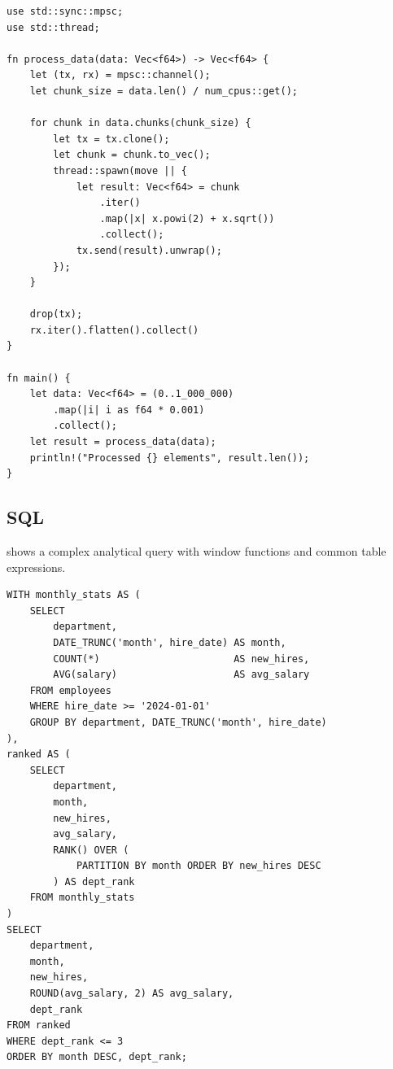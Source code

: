 \documentclass[
    language=english,
    doctype=article,
    institution=none,
    titlestyle=book,
]{../../omnilatex}
\theoremstyle{definition}
\theoremstyle{definition}
\theoremstyle{remark}
\begin{document}
\begin{listing}[htbp]
    \centering
    \begin{verbatim}
use std::sync::mpsc;
use std::thread;

fn process_data(data: Vec<f64>) -> Vec<f64> {
    let (tx, rx) = mpsc::channel();
    let chunk_size = data.len() / num_cpus::get();

    for chunk in data.chunks(chunk_size) {
        let tx = tx.clone();
        let chunk = chunk.to_vec();
        thread::spawn(move || {
            let result: Vec<f64> = chunk
                .iter()
                .map(|x| x.powi(2) + x.sqrt())
                .collect();
            tx.send(result).unwrap();
        });
    }

    drop(tx);
    rx.iter().flatten().collect()
}

fn main() {
    let data: Vec<f64> = (0..1_000_000)
        .map(|i| i as f64 * 0.001)
        .collect();
    let result = process_data(data);
    println!("Processed {} elements", result.len());
}
    \end{verbatim}
    \caption{Concurrent data processing in Rust using threads and channels.}
    \label{lst:rust}
\end{listing}


\subsection{SQL}
\label{sec:sql}

 shows a complex analytical query with window functions and
common table expressions.

\begin{listing}[htbp]
    \centering
    \begin{verbatim}
WITH monthly_stats AS (
    SELECT
        department,
        DATE_TRUNC('month', hire_date) AS month,
        COUNT(*)                       AS new_hires,
        AVG(salary)                    AS avg_salary
    FROM employees
    WHERE hire_date >= '2024-01-01'
    GROUP BY department, DATE_TRUNC('month', hire_date)
),
ranked AS (
    SELECT
        department,
        month,
        new_hires,
        avg_salary,
        RANK() OVER (
            PARTITION BY month ORDER BY new_hires DESC
        ) AS dept_rank
    FROM monthly_stats
)
SELECT
    department,
    month,
    new_hires,
    ROUND(avg_salary, 2) AS avg_salary,
    dept_rank
FROM ranked
WHERE dept_rank <= 3
ORDER BY month DESC, dept_rank;
    \end{verbatim}
    \caption{SQL analytical query using CTEs and window functions.}
    \label{lst:sql}
\end{listing}
\end{document}

